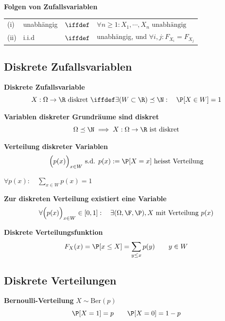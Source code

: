  \textbf{Folgen von Zufallsvariablen}

\begin{tabular}{llll}
    (i)     & unabhängig & $\iffdef$ & $\forall n \geq 1: X_1,\cdots,X_n \text{ unabhängig}$ \\
    (ii)    & i.i.d      & $\iffdef$ & unabhängig, und $\forall i, j: F_{X_i} = F_{X_j}$
\end{tabular}


\subsection{Diskrete Zufallsvariablen}

 \textbf{Diskrete Zufallsvariable}
$$
    X: \Omega \to \R \text{ diskret } \iffdef \exists (W \subset \R) \preceq \N:\quad \P[X \in W] = 1
$$

\lemma \textbf{Variablen diskreter Grundräume sind diskret}
$$
    \Omega \preceq \N \implies X: \Omega \to \R \text{ ist diskret}
$$

 \textbf{Verteilung diskreter Variablen}
$$
    \Bigl( p(x) \Bigr)_{x \in W} \text{ s.d. } p(x) := \P[X = x] \text{ heisst Verteilung}
$$

\theorem $\forall p(x):\quad \displaystyle\sum_{x \in W} p(x) = 1$ 

\lemma \textbf{Zur diskreten Verteilung existiert eine Variable}
$$
    \forall \Bigl( p(x) \Bigr)_{x \in W} \in [0,1]:\quad \exists (\Omega, \F, \P), X \text{ mit Verteilung } p(x)
$$

\theorem \textbf{Diskrete Verteilungsfunktion}
$$
    F_X(x) = \P[x \leq X] = \sum_{y \leq x} p(y) \qquad y \in W
$$

\newpage

\subsection{Diskrete Verteilungen}

 \textbf{Bernoulli-Verteilung} $X \sim \text{Ber}(p)$\\
$$
    \P[X=1] = p \qquad \P[X=0] = 1-p
$$

